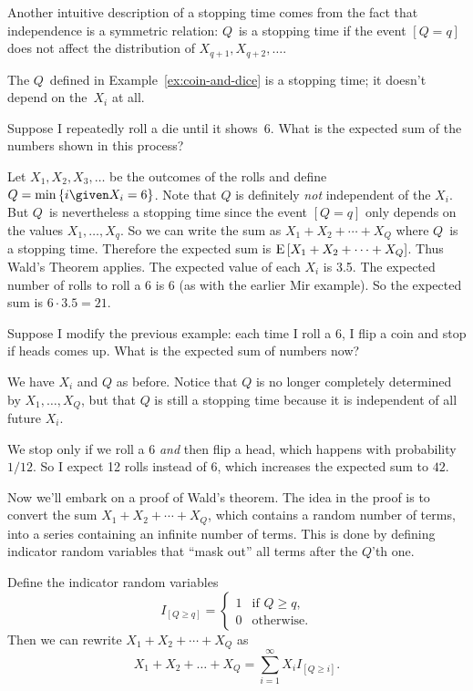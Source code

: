 \documentclass[11pt,twoside]{article}
\begin{document}
Another intuitive description of a stopping time comes from the fact
that independence is a symmetric relation: $Q$~is a stopping time if
the event $[Q = q]$ does not affect the distribution of $X_{q+1},
X_{q+2}, \dots$.
\begin{example}
  The $Q$~defined in Example~\ref{ex:coin-and-dice} is a stopping
  time; it doesn't depend on the~$X_i$ at all.
\end{example}
\begin{example}
  \label{ex:wald-dice}
  Suppose I repeatedly roll a die until it shows~6. What is the
  expected sum of the numbers shown in this process?

  Let $X_1, X_2, X_3, \ldots$ be the outcomes of the rolls and define
  $Q = \min\set{i \given X_i = 6}$.  Note that $Q$ is definitely
  \emph{not} independent of the $X_i$.  But $Q$~is nevertheless a
  stopping time since the event $[Q = q]$ only depends on the values
  $X_1, \ldots, X_q$.  So we can write the sum as $X_1 + X_2 + \cdots
  + X_Q$ where $Q$~is a stopping time. Therefore the expected sum is
  $\mathop{\textup{E}}\nolimits\left[X_1 + X_2 + \cdots + X_Q\right]$.  Thus Wald's Theorem applies.
  The expected value of each $X_i$ is 3.5.  The expected number of
  rolls to roll a 6 is 6 (as with the earlier Mir example).  So the
  expected sum is $6\cdot 3.5=21$.
\end{example}
\begin{example}
  Suppose I modify the previous example: each time I roll a 6, I flip
  a coin and stop if heads comes up.  What is the expected sum of
  numbers now?
  
  We have $X_i$ and $Q$ as before.  Notice that $Q$ is no longer
  completely determined by $X_1,\ldots,X_Q$, but that $Q$ is still a
  stopping time because it is independent of all future $X_i$.
  
  We stop only if we roll a 6 \emph{and} then flip a head, which
  happens with probability $1/12$.  So I expect 12 rolls instead of 6,
  which increases the expected sum to $42$.
\end{example}
Now we'll embark on a proof of Wald's theorem.  The idea in the proof
is to convert the sum $X_1 + X_2 + \cdots + X_Q$, which contains a
random number of terms, into a series containing an infinite number of
terms.  This is done by defining indicator random variables that ``mask
out'' all terms after the $Q$'th one.
\begin{lemma}
  \label{lem:wald-indicators}
  Define the indicator random variables
  \begin{displaymath}
    I_{[Q \geq q]} = \begin{cases}
      1 & \mbox{if $Q \geq q$,} \\
      0 & \mbox{otherwise.}
    \end{cases}
  \end{displaymath}
  Then we can rewrite $X_1 + X_2 + \cdots + X_Q$ as
  \begin{displaymath}
    X_1 + X_2 + \ldots + X_Q = \sum_{i=1}^{\infty} X_i I_{[Q \geq i]}.
  \end{displaymath}
\end{lemma}
\end{document}
